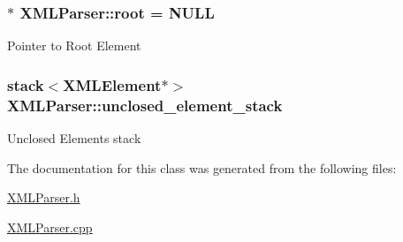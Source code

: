\subsubsection[{root}]{$\ast$ X\+M\+L\+Parser\+::root = N\+U\+L\+L\hspace{0.3cm}{\ttfamily [private]}}\label{class_x_m_l_parser_a2754d1cccc12558fe54596c38509ca62}
Pointer to Root Element \hypertarget{class_x_m_l_parser_a0a58d26870127737a3657b011a242fb4}{}
\subsubsection[{unclosed\+\_\+element\+\_\+stack}]{\setlength{\rightskip}{0pt plus 5cm}stack$<${\bf X\+M\+L\+Element}$\ast$$>$ X\+M\+L\+Parser\+::unclosed\+\_\+element\+\_\+stack\hspace{0.3cm}{\ttfamily [private]}}\label{class_x_m_l_parser_a0a58d26870127737a3657b011a242fb4}
Unclosed Elements stack 

The documentation for this class was generated from the following files\+:\begin{DoxyCompactItemize}
\item 
\hyperlink{_x_m_l_parser_8h}{X\+M\+L\+Parser.\+h}\item 
\hyperlink{_x_m_l_parser_8cpp}{X\+M\+L\+Parser.\+cpp}\end{DoxyCompactItemize}
